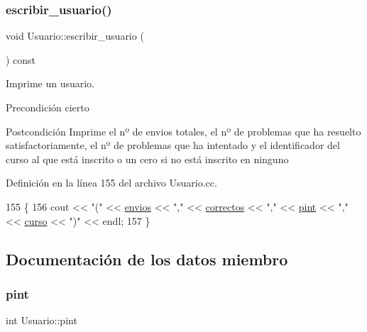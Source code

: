 \subsubsection{\texorpdfstring{escribir\+\_\+usuario()}{escribir\_usuario()}}
{\footnotesize\ttfamily void Usuario\+::escribir\+\_\+usuario (\begin{DoxyParamCaption}{ }\end{DoxyParamCaption}) const}



Imprime un usuario. 

\begin{DoxyPrecond}{Precondición}
cierto 
\end{DoxyPrecond}
\begin{DoxyPostcond}{Postcondición}
Imprime el nº de envios totales, el nº de problemas que ha resuelto satisfactoriamente, el nº de problemas que ha intentado y el identificador del curso al que está inscrito o un cero si no está inscrito en ninguno 
\end{DoxyPostcond}


Definición en la línea 155 del archivo Usuario.\+cc.


\begin{DoxyCode}
155                                            \{
156         cout << \textcolor{stringliteral}{"("} << \mbox{\hyperlink{class_usuario_a485a741c0646e6414bd6cf669a77fc9c}{envios}} << \textcolor{stringliteral}{","} << \mbox{\hyperlink{class_usuario_a6d7fd52e0625b61d324922bf4783435e}{correctos}} << \textcolor{stringliteral}{","} << \mbox{\hyperlink{class_usuario_adff16a149798e94b0747e7dc1bd85107}{pint}} << \textcolor{stringliteral}{","} << 
      \mbox{\hyperlink{class_usuario_aa767fe2d1198f2c97791073bc55803e7}{curso}} << \textcolor{stringliteral}{")"} << endl;
157       \}
\end{DoxyCode}


\subsection{Documentación de los datos miembro}
\mbox{\label{class_usuario_adff16a149798e94b0747e7dc1bd85107}} 
\subsubsection{\texorpdfstring{pint}{pint}}
{\footnotesize\ttfamily int Usuario\+::pint\hspace{0.3cm}{\ttfamily [private]}}



